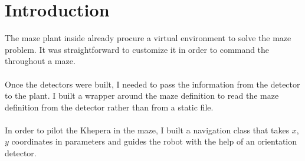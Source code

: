 \section{Introduction}

The maze plant inside \clsquare{} already procure a virtual environment to 
solve the maze problem. It was straightforward to customize it in order 
to command the \khepera{} throughout a maze. 
\\
\\
Once the detectors were built, I needed to pass the information from 
the detector to the plant. I built a wrapper around the maze definition 
to read the maze definition from the detector rather than from a static 
file. 
\\
\\
In order to pilot the Khepera in the maze, I built a navigation class 
that takes $x$, $y$ coordinates in parameters and guides the robot with the 
help of an orientation detector.
